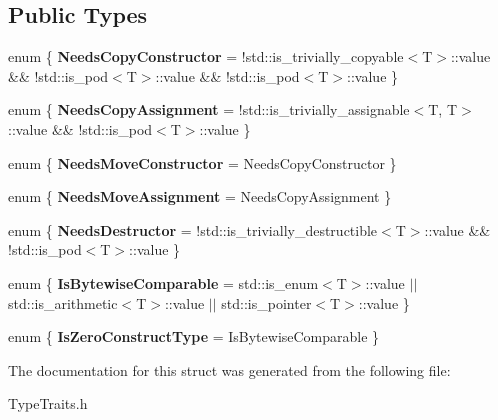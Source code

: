 \subsection*{Public Types}
\begin{DoxyCompactItemize}
\item 
\mbox{\label{struct_arcana_1_1_type_traits_base_a3e4718376ed114fd1b82783f373eb111}} 
enum \{ {\bfseries Needs\+Copy\+Constructor} = !std\+:\+:is\+\_\+trivially\+\_\+copyable$<$T$>$\+:\+:value \&\& !std\+:\+:is\+\_\+pod$<$T$>$\+:\+:value \&\& !std\+:\+:is\+\_\+pod$<$T$>$\+:\+:value
 \}
\item 
\mbox{\label{struct_arcana_1_1_type_traits_base_a15a07b77815712391596d889800decf7}} 
enum \{ {\bfseries Needs\+Copy\+Assignment} = !std\+:\+:is\+\_\+trivially\+\_\+assignable$<$T, T$>$\+:\+:value \&\& !std\+:\+:is\+\_\+pod$<$T$>$\+:\+:value
 \}
\item 
\mbox{\label{struct_arcana_1_1_type_traits_base_ae38cddd33259f6c95d67bec6e50b97c4}} 
enum \{ {\bfseries Needs\+Move\+Constructor} = Needs\+Copy\+Constructor
 \}
\item 
\mbox{\label{struct_arcana_1_1_type_traits_base_a927fa69db6026ee193a635bec0a3829e}} 
enum \{ {\bfseries Needs\+Move\+Assignment} = Needs\+Copy\+Assignment
 \}
\item 
\mbox{\label{struct_arcana_1_1_type_traits_base_a4895060b576fd5f7cc810fa1e2594e4e}} 
enum \{ {\bfseries Needs\+Destructor} = !std\+:\+:is\+\_\+trivially\+\_\+destructible$<$T$>$\+:\+:value \&\& !std\+:\+:is\+\_\+pod$<$T$>$\+:\+:value
 \}
\item 
\mbox{\label{struct_arcana_1_1_type_traits_base_a838078202a44d4fd2d4d1610d08070dd}} 
enum \{ {\bfseries Is\+Bytewise\+Comparable} = std\+:\+:is\+\_\+enum$<$T$>$\+:\+:value $\vert$$\vert$ std\+:\+:is\+\_\+arithmetic$<$T$>$\+:\+:value $\vert$$\vert$ std\+:\+:is\+\_\+pointer$<$T$>$\+:\+:value
 \}
\item 
\mbox{\label{struct_arcana_1_1_type_traits_base_a4aed896bc8ddf057e6a521673666fb5b}} 
enum \{ {\bfseries Is\+Zero\+Construct\+Type} = Is\+Bytewise\+Comparable
 \}
\end{DoxyCompactItemize}


The documentation for this struct was generated from the following file\+:\begin{DoxyCompactItemize}
\item 
Type\+Traits.\+h\end{DoxyCompactItemize}
